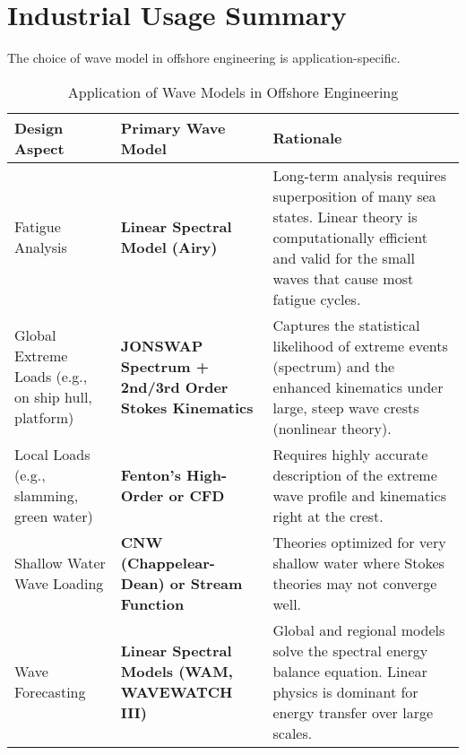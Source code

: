 \documentclass[11pt,letterpaper]{article}
\begin{document}
\section{Industrial Usage Summary}
The choice of wave model in offshore engineering is application-specific.
\begin{table}[H]
\centering
\caption{Application of Wave Models in Offshore Engineering}
\begin{tabular}{@{}p{3cm}p{7cm}p{3cm}@{}}
\toprule
Design Aspect & Primary Wave Model & Rationale \\
\midrule
Fatigue Analysis & \textbf{Linear Spectral Model (Airy)} & Long-term analysis requires superposition of many sea states. Linear theory is computationally efficient and valid for the small waves that cause most fatigue cycles. \\
Global Extreme Loads (e.g., on ship hull, platform) & \textbf{JONSWAP Spectrum + 2nd/3rd Order Stokes Kinematics} & Captures the statistical likelihood of extreme events (spectrum) and the enhanced kinematics under large, steep wave crests (nonlinear theory). \\
Local Loads (e.g., slamming, green water) & \textbf{Fenton's High-Order or CFD} & Requires highly accurate description of the extreme wave profile and kinematics right at the crest. \\
Shallow Water Wave Loading & \textbf{CNW (Chappelear-Dean) or Stream Function} & Theories optimized for very shallow water where Stokes theories may not converge well. \\
Wave Forecasting & \textbf{Linear Spectral Models (WAM, WAVEWATCH III)} & Global and regional models solve the spectral energy balance equation. Linear physics is dominant for energy transfer over large scales. \\
\bottomrule
\end{tabular}
\end{table}
\end{document}
